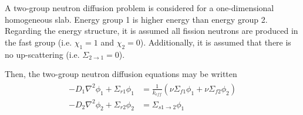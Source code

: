 \documentclass{article}
\begin{document}
  A two-group neutron diffusion problem is considered for a one-dimensional
  homogeneous slab. Energy group 1 is higher energy than energy group 2. 
  Regarding the energy structure, it is assumed all fission neutrons are 
  produced in the fast group (i.e. $\chi_1=1$ and $\chi_2=0$). Additionally, 
  it is assumed that there is no up-scattering 
  (i.e. $\Sigma_{2\rightarrow1}=0$).
  
  Then, the two-group neutron diffusion equations may be written
  \begin{align} \label{eq:twogroup}
  \begin{split}
    -D_1 \nabla^2 \phi_1 + \Sigma_{r1} \phi_1 &= \frac{1}{k_{eff}} \left(\nu 
      \Sigma_{f1} \phi_1 + \nu \Sigma_{f2} \phi_2 \right) \\
    -D_2 \nabla^2 \phi_2 + \Sigma_{r2} \phi_2 &= \Sigma_{s1\rightarrow2} 
      \phi_1 
  \end{split}
  \end{align}
  
\end{document}
